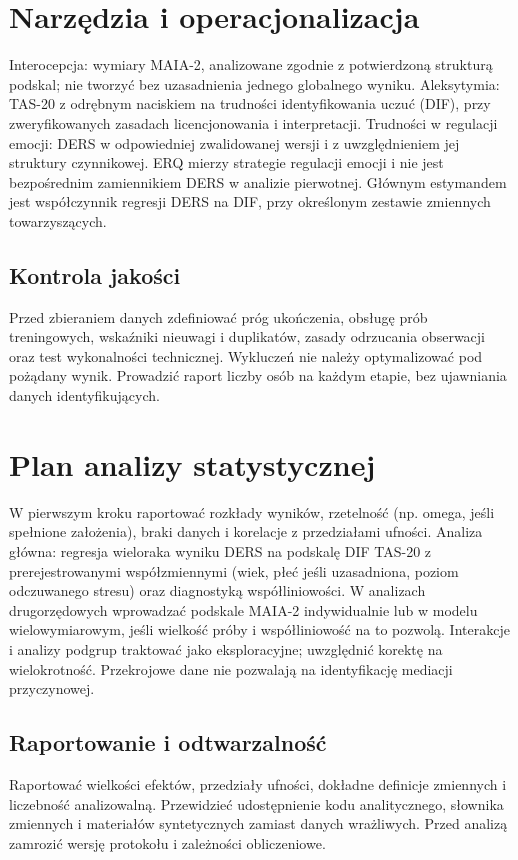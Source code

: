 \documentclass[11pt,a4paper]{article}
\begin{document}
\section{Narzędzia i operacjonalizacja}
Interocepcja: wymiary MAIA-2, analizowane zgodnie z potwierdzoną strukturą podskal; nie tworzyć bez uzasadnienia jednego globalnego wyniku. Aleksytymia: TAS-20 z odrębnym naciskiem na trudności identyfikowania uczuć (DIF), przy zweryfikowanych zasadach licencjonowania i interpretacji. Trudności w regulacji emocji: DERS w odpowiedniej zwalidowanej wersji i z uwzględnieniem jej struktury czynnikowej. ERQ mierzy strategie regulacji emocji i nie jest bezpośrednim zamiennikiem DERS w analizie pierwotnej. Głównym estymandem jest współczynnik regresji DERS na DIF, przy określonym zestawie zmiennych towarzyszących.
\subsection{Kontrola jakości}
Przed zbieraniem danych zdefiniować próg ukończenia, obsługę prób treningowych, wskaźniki nieuwagi i duplikatów, zasady odrzucania obserwacji oraz test wykonalności technicznej. Wykluczeń nie należy optymalizować pod pożądany wynik. Prowadzić raport liczby osób na każdym etapie, bez ujawniania danych identyfikujących.
\section{Plan analizy statystycznej}
W pierwszym kroku raportować rozkłady wyników, rzetelność (np. omega, jeśli spełnione założenia), braki danych i korelacje z przedziałami ufności. Analiza główna: regresja wieloraka wyniku DERS na podskalę DIF TAS-20 z prerejestrowanymi współzmiennymi (wiek, płeć jeśli uzasadniona, poziom odczuwanego stresu) oraz diagnostyką współliniowości. W analizach drugorzędowych wprowadzać podskale MAIA-2 indywidualnie lub w modelu wielowymiarowym, jeśli wielkość próby i współliniowość na to pozwolą. Interakcje i analizy podgrup traktować jako eksploracyjne; uwzględnić korektę na wielokrotność. Przekrojowe dane nie pozwalają na identyfikację mediacji przyczynowej.
\subsection{Raportowanie i odtwarzalność}
Raportować wielkości efektów, przedziały ufności, dokładne definicje zmiennych i liczebność analizowalną. Przewidzieć udostępnienie kodu analitycznego, słownika zmiennych i materiałów syntetycznych zamiast danych wrażliwych. Przed analizą zamrozić wersję protokołu i zależności obliczeniowe.
\end{document}
